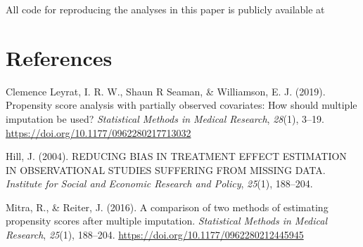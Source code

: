 \documentclass{article}
\newlength{\cslhangindent}
\newlength{\cslentryspacingunit} %
\newenvironment{CSLReferences}[2] %
 {%
  \setlength{\parindent}{0pt}
  \ifodd #1
  \let\oldpar\par
  \def\par{\hangindent=\cslhangindent\oldpar}
  \fi
  \setlength{\parskip}{#2\cslentryspacingunit}
 }%
 {}
\begin{document}
All code for reproducing the analyses in this paper is publicly
available at

\hypertarget{references}{%
\section*{References}\label{references}}

\hypertarget{refs}{}
\begin{CSLReferences}{1}{0}
\leavevmode{}%
Clemence Leyrat, I. R. W., Shaun R Seaman, \& Williamson, E. J. (2019).
Propensity score analysis with partially observed covariates: How should
multiple imputation be used? \emph{Statistical Methods in Medical
Research}, \emph{28}(1), 3--19.
\url{https://doi.org/10.1177/0962280217713032}

\leavevmode{}%
Hill, J. (2004). REDUCING BIAS IN TREATMENT EFFECT ESTIMATION IN
OBSERVATIONAL STUDIES SUFFERING FROM MISSING DATA. \emph{Institute for
Social and Economic Research and Policy}, \emph{25}(1), 188--204.

\leavevmode{}%
Mitra, R., \& Reiter, J. (2016). A comparison of two methods of
estimating propensity scores after multiple imputation.
\emph{Statistical Methods in Medical Research}, \emph{25}(1), 188--204.
\url{https://doi.org/10.1177/0962280212445945}

\end{CSLReferences}



\end{document}
